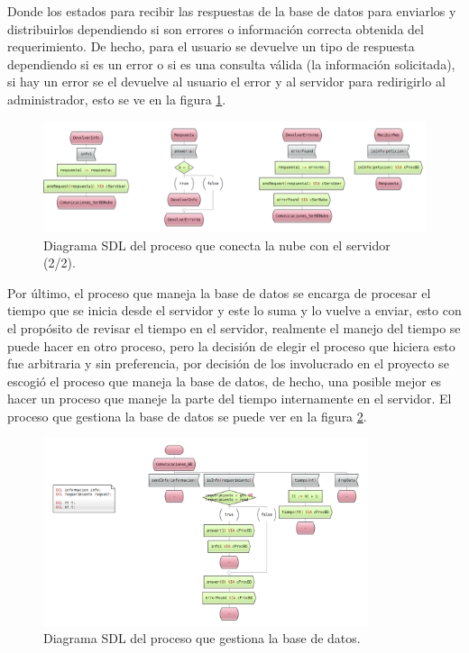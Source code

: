 Donde los estados para recibir las respuestas de la base de datos para enviarlos y distribuirlos dependiendo si son errores o información correcta obtenida del requerimiento. De hecho, para el usuario se devuelve un tipo de respuesta dependiendo si es un error o si es una consulta válida (la información solicitada), si hay un error se el devuelve al usuario el error y al servidor para redirigirlo al administrador, esto se ve en la figura \ref{ProcesoBD2}.

\begin{figure}[h]
    \centering
    \includegraphics[width=1.0\textwidth]{images/Proceso_BD2x.png}
    \caption{Diagrama SDL del proceso que conecta la nube con el servidor (2/2).}
    \label{ProcesoBD2}
\end{figure}

\pagebreak

Por último, el proceso que maneja la base de datos se encarga de procesar el tiempo que se inicia desde el servidor y este lo suma y lo vuelve a enviar, esto con el propósito de revisar el tiempo en el servidor, realmente el manejo del tiempo se puede hacer en otro proceso, pero la decisión de elegir el proceso que hiciera esto fue arbitraria y sin preferencia, por decisión de los involucrado en el proyecto se escogió el proceso que maneja la base de datos, de hecho, una posible mejor es hacer un proceso que maneje la parte del tiempo internamente en el servidor. El proceso que gestiona la base de datos se puede ver en la figura \ref{ProcesoGestionBDSDL}.

\begin{figure}[h]
    \centering
    \includegraphics[width=0.85\textwidth]{images/Proceso_GestionBDx.png}
    \caption{Diagrama SDL del proceso que gestiona la base de datos.}
    \label{ProcesoGestionBDSDL}
\end{figure}

